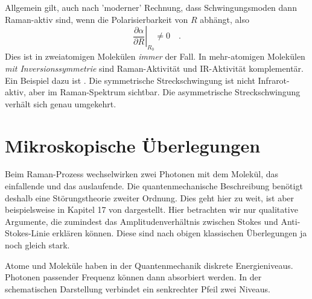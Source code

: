 Allgemein gilt, auch nach 'moderner' Rechnung, dass Schwingungsmoden dann Raman-aktiv sind, wenn die  Polarisierbarkeit von $R$ abhängt, also 
\begin{equation}
\left. \frac{\partial \alpha}{\partial R} \right|_{R_0} \neq 0 \quad .
\end{equation}
Dies ist in zweiatomigen Molekülen \emph{immer} der Fall. In mehr-atomigen Molekülen \emph{mit Inversionssymmetrie} sind Raman-Aktivität und IR-Aktivität komplementär. Ein Beispiel dazu ist . Die symmetrische Streckschwingung ist nicht Infrarot-aktiv, aber im Raman-Spektrum sichtbar. Die asymmetrische Streckschwingung verhält sich genau umgekehrt.


\section{Mikroskopische Überlegungen}

Beim Raman-Prozess wechselwirken zwei Photonen mit dem Molekül, das einfallende und das auslaufende. Die quantenmechanische Beschreibung benötigt deshalb eine Störungstheorie zweiter Ordnung. Dies geht hier zu weit, ist aber beispielsweise in Kapitel 17 von \cite{Haken_wolf_II} dargestellt. Hier betrachten wir nur qualitative Argumente, die zumindest das Amplitudenverhältnis zwischen Stokes und Anti-Stokes-Linie erklären können. Diese sind nach obigen klassischen Überlegungen ja noch gleich stark.

Atome und Moleküle haben in der Quantenmechanik diskrete Energieniveaus. Photonen passender Frequenz können dann absorbiert werden. In der schematischen Darstellung verbindet ein senkrechter Pfeil zwei Niveaus.

\begin{marginfigure}
\end{marginfigure}
 

